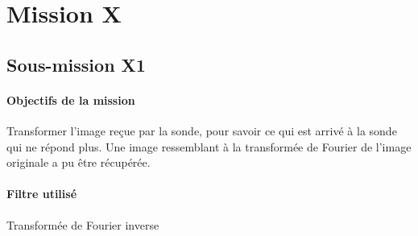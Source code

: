 \section{Mission X}
	\subsection{Sous-mission X1}

	\begin{vwcol}[widths={0.8,0.2}, rule=0pt]
	\begin{minipage}{0.7\textwidth}
	\paragraph{Objectifs de la mission}

	Transformer l'image reçue par la sonde, pour savoir ce qui est arrivé à la sonde qui ne répond plus. Une image ressemblant à la transformée de Fourier de l'image originale a pu être récupérée.
	\end{minipage}
	\begin{minipage}{0.2\textwidth}
		\begin{flushright}
			\paragraph{Filtre utilisé}
		Transformée de Fourier inverse
		\end{flushright}
	\end{minipage}
	\end{vwcol} 

